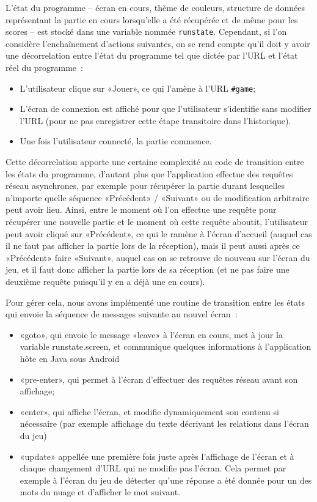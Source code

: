 \documentclass[a4paper,11pt,french]{article}
\begin{document}
L'état du programme -- écran en cours, thème de couleurs, structure de données représentant la partie en cours lorsqu'elle a été récupérée et de même pour les scores -- est stocké dans une variable nommée \verb!runstate!. Cependant, si l'on considère l'enchaînement d'actions
suivantes, on se rend compte qu'il doit y avoir une décorrelation entre l'état du programme tel que dictée par l'URL et l'état réel du
programme~:

\begin{itemize}
\item L'utilisateur clique sur «Jouer», ce qui l'amène à l'URL \verb!#game!;
\item L'écran de connexion est affiché pour que l'utilisateur s'identifie sans modifier l'URL (pour ne pas enregistrer cette étape
  transitoire dans l'historique).
\item Une fois l'utilisateur connecté, la partie commence.
\end{itemize}

Cette décorrelation apporte une certaine complexité au code de transition entre les états du programme, d'autant plus que l'application
effectue des requêtes réseau asynchrones, par exemple pour récupérer la partie durant lesquelles n'importe quelle séquence «Précédent» /
«Suivant» ou de modification arbitraire peut avoir lieu. Ainsi, entre le moment où l'on effectue une requête pour récupérer une nouvelle
partie et le moment où cette requête aboutit, l'utilisateur peut avoir cliqué sur «Précédent», ce qui le ramène à l'écran d'accueil (auquel
cas il ne faut pas afficher la partie lors de la réception), mais il peut aussi après ce «Précédent» faire «Suivant», auquel cas on se
retrouve de nouveau sur l'écran du jeu, et il faut donc afficher la partie lors de sa réception (et ne pas faire une deuxième requête
puisqu'il y en a déjà une en cours).

Pour gérer cela, nous avons implémenté une routine de transition entre les états qui envoie la séquence de messages suivante au nouvel
écran~:
\begin{itemize}
\item «goto», qui envoie le message «leave» à l'écran en cours, met à jour la variable runstate.screen, et communique quelques informations
  à l'application hôte en Java sous Android
\item «pre-enter», qui permet à l'écran d'effectuer des requêtes réseau avant son affichage;
\item «enter», qui affiche l'écran, et modifie dynamiquement son contenu si nécessaire (par exemple affichage du texte décrivant les
  relations dans l'écran du jeu)
\item «update» appellée une première fois juste après l'affichage de l'écran et à chaque changement d'URL qui ne modifie pas l'écran. Cela
  permet par exemple à l'écran du jeu de détecter qu'une réponse a été donnée pour un des mots du nuage et d'afficher le mot suivant.
\end{itemize}
\end{document}
